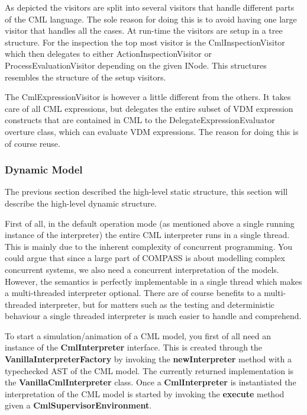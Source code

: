 \documentclass[a4paper, 10pt]{include/compassreport}   %
\begin{document}
As depicted the visitors are split into several visitors that handle
different parts of the CML language. The sole reason for doing this is
to avoid having one large visitor that handles all the cases. At
run-time the visitors are setup in a tree structure. For the
inspection the top most visitor is the CmlInspectionVisitor which then
delegates to either ActionInspectionVisitor or
ProcessEvaluationVisitor depending on the given INode. This structures
resembles the structure of the setup visitors.

The CmlExpressionVisitor is however a little different from the
others. It takes care of all CML expressions, but delegates the entire
subset of VDM expression constructs that are contained in CML to the
DelegateExpressionEvaluator overture class, which can evaluate VDM
expressions. The reason for doing this is of course reuse.

\subsubsection{Dynamic Model}
\label{sec:dynamic_structure}

The previous section described the high-level static structure, this
section will describe the high-level dynamic structure.

First of all, in the default operation mode (as mentioned above a
single running instance of the interpreter) the entire CML interpreter
runs in a single thread. This is mainly due to the inherent complexity
of concurrent programming. You could argue that since a large part of
COMPASS is about modelling complex concurrent systems, we also need a
concurrent interpretation of the models. However, the semantics is
perfectly implementable in a single thread which makes a
multi-threaded interpreter optional. There are of course benefits to a
multi-threaded interpreter, but for matters such
as the testing and deterministic behaviour a single threaded
interpreter is much easier to handle and comprehend.

To start a simulation/animation of a CML model, you first of all need
an instance of the \textbf{CmlInterpreter} interface. This is created
through the \textbf{VanillaInterpreterFactory} by invoking the
\textbf{newInterpreter} method with a typechecked AST of the CML
model. The currently returned implementation is the
\textbf{VanillaCmlInterpreter} class. Once a \textbf{CmlInterpreter}
is instantiated the interpretation of the CML model is started
by invoking the \textbf{execute} method given a
\textbf{CmlSupervisorEnvironment}.
\end{document}
